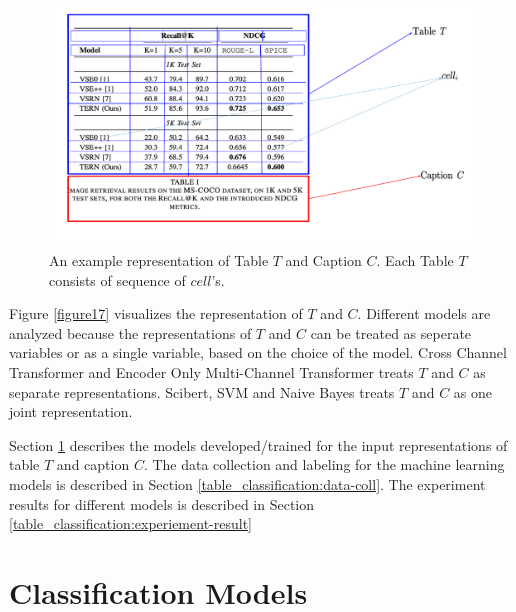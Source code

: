 \begin{figure}[h]
    \centering
    \includegraphics[width=\maxwidth{\textwidth}]{src/images/table-structure.pdf}
    \caption{An example representation of Table $T$ and Caption $C$. Each Table $T$ consists of sequence of $cell$'s. }
    \label{figure\arabic{figurecounter}}
\end{figure}

Figure \ref{figure17} visualizes the representation of $T$ and $C$. Different models are analyzed because the representations of $T$ and $C$ can be treated as seperate variables or as a single variable, based on the choice of the model. Cross Channel Transformer and Encoder Only Multi-Channel Transformer treats $T$ and $C$ as separate representations. Scibert, SVM and Naive Bayes treats $T$ and $C$ as one joint representation. 


Section \ref{table_classification:models} describes the models developed/trained for the input representations of table $T$ and caption $C$. The data collection and labeling for the machine learning models is described in Section \ref{table_classification:data-coll}. The experiment results for different models is described in Section \ref{table_classification:experiement-result}

\section{Classification Models}
\label{table_classification:models}

